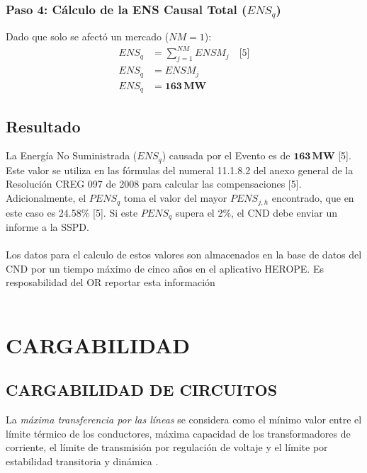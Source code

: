 \documentclass[a5paper]{book}%
\begin{document}
  \subsection*{Paso 4: Cálculo de la ENS Causal Total ($ENS_q$)}
  
  Dado que solo se afectó un mercado ($NM=1$):
  \begin{align*}
  	ENS_q &= \sum_{j=1}^{NM} ENSM_j \quad \text{[5]} \\
  	ENS_q &= ENSM_j \\
  	ENS_q &= \mathbf{163 \, \text{MW}}
  \end{align*}
  
  \section*{Resultado}
  
  La Energía No Suministrada ($ENS_q$) causada por el Evento es de $\mathbf{163 \, \text{MW}}$ [5]. Este valor se utiliza en las fórmulas del numeral 11.1.8.2 del anexo general de la Resolución CREG 097 de 2008 para calcular las compensaciones [5]. Adicionalmente, el $PENS_q$ toma el valor del mayor $PENS_{j,h}$ encontrado, que en este caso es 24.58\% [5]. Si este $PENS_q$ supera el 2\%, el CND debe enviar un informe a la SSPD.\\\\
  


  
\hspace{1cm}
  Los datos para el calculo de estos valores son almacenados en la
  base de datos del CND por un tiempo máximo de cinco años en el
  aplicativo HEROPE. Es resposabilidad del OR reportar esta
  información\\\\
  
\chapter{CARGABILIDAD}
\section{CARGABILIDAD DE CIRCUITOS}
 La \textit{máxima transferencia por las líneas} se considera
  como el mínimo valor entre el límite térmico de los conductores,
  máxima capacidad de los transformadores de corriente, el límite de
  transmisión por regulación de voltaje y el límite por estabilidad
  transitoria y dinámica \cite{CREG0251995}.\\\\
\end{document}
